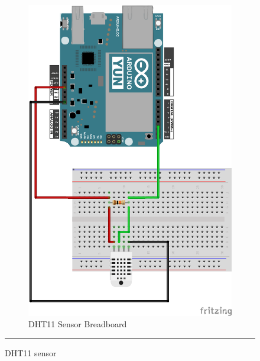 \documentclass[12pt, a4paper,twoside]{tesi_upf}
\begin{document}
\begin{figure}
\begin{subfigure}[b]{0.3\textwidth}
                \includegraphics[width=\textwidth]{./Figures/Fritzing/HumiditySensorDht11_bb.png}
                \caption{DHT11 Sensor Breadboard}
                \label{fig:HumiditySensordht11_bb}
        \end{subfigure}
        \rule{18em}{0.5pt}
        \caption{DHT11 sensor}\label{fig:DHT11sensor}
			\end{figure}     
      
\end{document}
